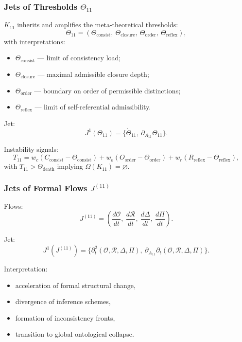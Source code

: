 \subsubsection{Jets of Thresholds $\Theta_{11}$}

$K_{11}$ inherits and amplifies the meta-theoretical thresholds:
\[
\Theta_{11}
=
(\Theta_{\mathrm{consist}},\ 
 \Theta_{\mathrm{closure}},\ 
 \Theta_{\mathrm{order}},\ 
 \Theta_{\mathrm{reflex}}),
\]
with interpretations:
\begin{itemize}
    \item $\Theta_{\mathrm{consist}}$ — limit of consistency load;
    \item $\Theta_{\mathrm{closure}}$ — maximal admissible closure depth;
    \item $\Theta_{\mathrm{order}}$ — boundary on order of permissible distinctions;
    \item $\Theta_{\mathrm{reflex}}$ — limit of self-referential admissibility.
\end{itemize}

Jet:
\[
J^1(\Theta_{11})
=
\{\dot{\Theta}_{11},\ \partial_{A_{11}}\Theta_{11}\}.
\]

Instability signals:
\[
T_{11}
=
w_c (C_{\mathrm{consist}}-\Theta_{\mathrm{consist}})
+
w_o (O_{\mathrm{order}}-\Theta_{\mathrm{order}})
+
w_r (R_{\mathrm{reflex}}-\Theta_{\mathrm{reflex}}),
\]
with $T_{11}>\Theta_{\mathrm{death}}$ implying
$\Omega(K_{11})=\varnothing$.


\subsubsection{Jets of Formal Flows $J^{(11)}$}

Flows:
\[
J^{(11)}
=
\left(
\frac{d\mathcal{O}}{dt},\ 
\frac{d\mathcal{R}}{dt},\ 
\frac{d\Delta}{dt},\ 
\frac{d\Pi}{dt}
\right).
\]

Jet:
\[
J^1(J^{(11)})
=
\big\{
\partial_t^2(\mathcal{O},\mathcal{R},\Delta,\Pi),\ 
\partial_{A_{11}}\partial_t(\mathcal{O},\mathcal{R},\Delta,\Pi)
\big\}.
\]

Interpretation:
\begin{itemize}
    \item acceleration of formal structural change,
    \item divergence of inference schemes,
    \item formation of inconsistency fronts,
    \item transition to global ontological collapse.
\end{itemize}


